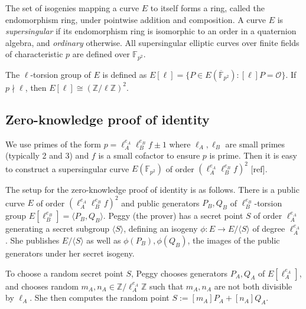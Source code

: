 \documentclass{amsart}
\theoremstyle{plain}
\theoremstyle{remark}
\numberwithin{equation}{section}
\begin{document}
The set of isogenies mapping a curve $E$ to itself forms a ring, called the endomorphism ring, under pointwise addition and composition. A curve $E$ is \emph{supersingular} if its endomorphism ring is isomorphic to an order in a quaternion algebra, and \emph{ordinary} otherwise. All supersingular elliptic curves over finite fields of characteristic $p$ are defined over $\mathbb{F}_{p^2}$.

The $\ell$-torsion group of $E$ is defined as $E[\ell] = \{P \in E(\overline{\mathbb{F}}_{p^2}) : [\ell] P = \mathcal{O}\}$. If $p \nmid \ell$, then $E[\ell] \cong (\mathbb{Z}/\ell\mathbb{Z})^2$.

\subsection{Zero-knowledge proof of identity}
We use primes of the form $p = \ell_A^{e_A}\ell_B^{e_B}f \pm 1$ where $\ell_A, \ell_B$ are small primes (typically 2 and 3) and $f$ is a small cofactor to ensure $p$ is prime. Then it is easy to construct a supersingular curve $E(\mathbb{F}_{p^2})$ of order $(\ell_A^{e_A}\ell_B^{e_B}f)^2$ [ref].

The setup for the zero-knowledge proof of identity is as follows. There is a public curve $E$ of order $(\ell_A^{e_A}\ell_B^{e_B}f)^2$ and public generators $P_B, Q_B$ of $\ell_B^{e_B}$-torsion group $E[\ell_B^{e_B}] = \langle P_B,Q_B\rangle$. Peggy (the prover) has a secret point $S$ of order $\ell_A^{e_A}$ generating a secret subgroup $\langle S \rangle$, defining an isogeny $\phi:E \to E/\langle S\rangle$ of degree $\ell_A^{e_A}$. She publishes $E/\langle S \rangle$ as well as $\phi(P_B), \phi(Q_B)$, the images of the public generators under her secret isogeny.

To choose a random secret point $S$, Peggy chooses generators $P_A,Q_A$ of $E[\ell_A^{e_A}]$, and chooses random $m_A,n_A \in \mathbb{Z}/\ell_A^{e_A}\mathbb{Z}$ such that $m_A,n_A$ are not both divisible by $\ell_A$. She then computes the random point $S := [m_A]P_A + [n_A]Q_A$.
\end{document}

